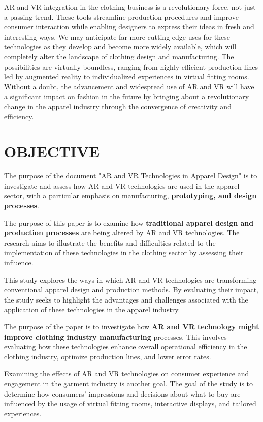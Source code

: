 \documentclass[10pt]{article}
\begin{document}
AR and VR integration in the clothing business is a revolutionary force, not just a passing trend. These tools streamline production procedures and improve consumer interaction while enabling designers to express their ideas in fresh and interesting ways. We may anticipate far more cutting-edge uses for these technologies as they develop and become more widely available, which will completely alter the landscape of clothing design and manufacturing. The possibilities are virtually boundless, ranging from highly efficient production lines led by augmented reality to individualized experiences in virtual fitting rooms. Without a doubt, the advancement and widespread use of AR and VR will have a significant impact on fashion in the future by bringing about a revolutionary change in the apparel industry through the convergence of creativity and efficiency.

\section*{OBJECTIVE}
The purpose of the document "AR and VR Technologies in Apparel Design" is to investigate and assess how AR and VR technologies are used in the apparel sector, with a particular emphasis on manufacturing, \textbf{prototyping, and design processes}.

The purpose of this paper is to examine how \textbf{traditional apparel design and production processes }are being altered by AR and VR technologies. The research aims to illustrate the benefits and difficulties related to the implementation of these technologies in the clothing sector by assessing their influence.

This study explores the ways in which AR and VR technologies are transforming conventional apparel design and production methods. By evaluating their impact, the study seeks to highlight the advantages and challenges associated with the application of these technologies in the apparel industry.

The purpose of the paper is to investigate how \textbf{AR and VR technology might improve clothing industry manufacturing} processes. This involves evaluating how these technologies enhance overall operational efficiency in the clothing industry, optimize production lines, and lower error rates.

Examining the effects of AR and VR technologies on consumer experience and engagement in the garment industry is another goal. The goal of the study is to determine how consumers' impressions and decisions about what to buy are influenced by the usage of virtual fitting rooms, interactive displays, and tailored experiences.
\end{document}
